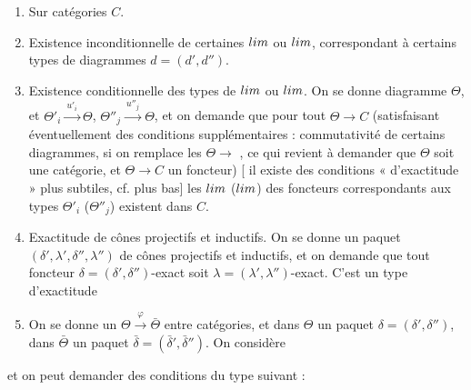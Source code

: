 \documentclass[11pt,a4paper]{article}
\begin{document}
\begin{enumerate}
  \item[$1$)] Sur catégories $C$.
  \item[a)] Existence inconditionnelle  de certaines
    $\varprojlim$ ou $\varinjlim$, correspondant à certains types de diagrammes
    $d = (d', d'')$.
  \item[b)] Existence conditionnelle des types de $\varprojlim$ ou
    $\varinjlim$. On se donne \struck{\ill{}}  diagramme $\Theta$, et
     \ill{}
    $\Theta'_i \xrightarrow{\ u'_i\ } \Theta$,
    $\Theta''_j \xrightarrow{\ u''_j\ } \Theta$, et on demande que pour tout
    $\Theta \to C$ (satisfaisant éventuellement des conditions supplémentaires :
    commutativité de certains diagrammes, si on remplace les $\Theta \to$ \ill{},
    ce qui revient à demander que $\Theta$ soit une catégorie, et
    $\Theta \to C$ un foncteur) [\ill{} il existe des conditions
    « d'exactitude » plus subtiles, cf. plus bas] les $\varprojlim$
    ($\varinjlim$) des foncteurs correspondants aux types $\Theta'_i$
    ($\Theta''_j$) existent dans $C$.
  \item[c)] Exactitude de cônes projectifs  \ill{} et
    inductifs. On se donne \ill{} un paquet
    $(\delta', \lambda', \delta'', \lambda'')$ de cônes projectifs et inductifs,
    et on demande que tout foncteur $\delta = (\delta',\delta'')$-exact soit
    $\lambda = (\lambda', \lambda'')$-exact. C'est un type d'exactitude \ill{}
  \item[d)] On se donne un  
    $\Theta \xrightarrow{\ \varphi\ } \bar\Theta$ entre catégories, et dans
    $\Theta$ un paquet $\delta = (\delta', \delta'')$, dans $\bar\Theta$ un
    paquet $\bar\delta = (\bar\delta', \bar\delta'')$. On considère
\end{enumerate}



et on peut demander des conditions du type suivant :
\end{document}
